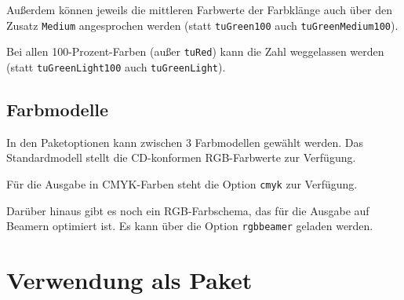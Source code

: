 Außerdem können jeweils die mittleren Farbwerte der Farbklänge auch über den
Zusatz \lstinline{Medium} angesprochen werden (statt \lstinline{tuGreen100} auch
\lstinline{tuGreenMedium100}).

Bei allen 100-Prozent-Farben (außer \lstinline{tuRed}) kann die
Zahl weggelassen werden (statt \lstinline{tuGreenLight100} auch 
\lstinline{tuGreenLight}).

\subsection{Farbmodelle}

In den Paketoptionen kann zwischen 3 Farbmodellen gewählt werden.
Das Standardmodell stellt die CD-konformen RGB-Farbwerte zur Verfügung.

Für die Ausgabe in CMYK-Farben steht die Option \lstinline!cmyk! zur Verfügung.

Darüber hinaus gibt es noch ein RGB-Farbschema, das für die Ausgabe auf
Beamern optimiert ist. Es kann über die Option \lstinline!rgbbeamer! geladen
werden.

\section{Verwendung als Paket}



